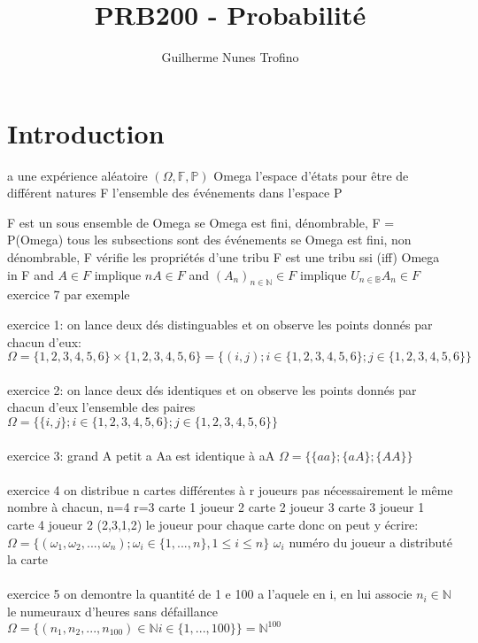 \documentclass{article}
\title{PRB200 - Probabilité}
\author{Guilherme Nunes Trofino}
\begin{document}
\maketitle

\newpage\tableofcontents

\section{Introduction}
a
une expérience aléatoire 
$ (\Omega, \mathbb{F}, \mathbb{P})$
Omega l'espace d'états pour être de différent natures
F l'ensemble des événements dans l'espace
P

F est un sous ensemble de Omega  
se Omega est fini, dénombrable, F = P(Omega) tous les subsections sont des événements
se Omega est fini, non dénombrable, F vérifie les propriétés d'une tribu F est une tribu ssi (iff) Omega in F and $A \in F$ implique $nA \in F$ and $(A_n)_{n\in\mathbb{N}} \in F$ implique $U_{n\in\mathbb{B}}A_n \in F$ exercice 7 par exemple


exercice 1:
on lance deux dés distinguables et on observe les points donnés par chacun d'eux:
$\Omega = \{ 1,2,3,4,5,6 \} \times \{ 1,2,3,4,5,6 \} = \{ (i,j); i \in \{1,2,3,4,5,6\}; j \in \{ 1,2,3,4,5,6 \} \}$
\\\\
exercice 2:
on lance deux dés identiques et on observe les points donnés par chacun d'eux
l'ensemble des paires
$\Omega = \{ \{i,j\}; i \in \{1,2,3,4,5,6\}; j \in \{ 1,2,3,4,5,6 \} \}$
\\\\
exercice 3:
grand A petit a
Aa est identique à aA
$\Omega = \{ \{ aa \}; \{ aA \}; \{ AA \} \}$
\\\\
exercice 4
on distribue n cartes différentes à r joueurs pas nécessairement le même nombre à chacun, 
n=4 r=3
carte 1 joueur 2
carte 2 joueur 3
carte 3 joueur 1
carte 4 joueur 2
(2,3,1,2) le joueur pour chaque carte donc on peut y écrire:
$\Omega = \{ (\omega_1, \omega_2, ..., \omega_n); \omega_i \in \{ 1, ..., n \}, 1 \leq i \leq n \}$
$\omega_i$ numéro du joueur a distributé la carte
\\\\

exercice 5
on demontre la quantité de 1 e 100 a l'aquele en i, en lui associe $n_i \in \mathbb{N}$ le numeuraux d'heures sans défaillance
$\Omega = \{ (n_1, n_2, ..., n_{100}) \in \mathbb{N} i\in\{1, ..., 100\}\} = \mathbb{N}^{100}$
\\\\
\end{document}
